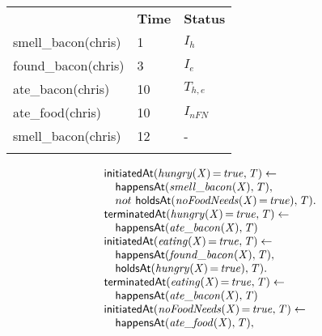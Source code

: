 \documentclass[8pt]{beamer}
\DeclareMathOperator{\val}{=}  %
\def \patsize {}
\def\happensAt{\textsf{\patsize happensAt}}
\def\holdsAt{\textsf{\patsize holdsAt}}
\def\initiatedAt{\textsf{\patsize initiatedAt}}
\def\terminatedAt{\textsf{\patsize terminatedAt}}
\newenvironment{mysplit}%
  {\arraycolsep 0pt \begin{array}{l}}%
  {\end{array}}
\begin{document}
\begin{frame}
\begin{minipage}{0.4\linewidth}
\begin{table}[t!]
\begin{center}
                \begin{tabular}{lll}
                    \hline\noalign{\smallskip}
                    \multicolumn{1}{l}{\textbf{Event}} & \multicolumn{1}{c}{\textbf{Time}} & \multicolumn{1}{c}{\textbf{Status}} \\
                    smell\_bacon(chris)& 1 & $I_{h}$\\
                    found\_bacon(chris)& 3 & $I_{e}$\\
                    ate\_bacon(chris)& 10  & $T_{h,e}$\\
                    ate\_food(chris)& 10  & $I_{nFN}$\\
                    smell\_bacon(chris)& 12 & -\\
                    \noalign{\smallskip}
                    \hline
                \end{tabular}
            \end{center}
        \end{table}
    \end{minipage}
    \begin{minipage}{0.55\linewidth}
        \begin{align*}
            \begin{mysplit}
                \initiatedAt\mathit{(hungry(X)\val true,T)\leftarrow}\\
                \quad    \happensAt\mathit{(smell\_bacon(X),T),}\\
                \quad    not\ \holdsAt\mathit{(noFoodNeeds(X)\val true),T).}\\
                \terminatedAt\mathit{(hungry(X)\val true,T)\leftarrow}\\
                \quad    \happensAt\mathit{(ate\_bacon(X),T)}\\
                \initiatedAt\mathit{(eating(X)\val true,T)\leftarrow}\\
                \quad    \happensAt\mathit{(found\_bacon(X),T),}\\
                \quad    \holdsAt\mathit{(hungry(X)\val true),T).}\\
                \terminatedAt\mathit{(eating(X)\val true,T)\leftarrow}\\
                \quad    \happensAt\mathit{(ate\_bacon(X),T)}\\
                \initiatedAt\mathit{(noFoodNeeds(X)\val true,T)\leftarrow}\\
                \quad    \happensAt\mathit{(ate\_food(X),T),}\\

\end{mysplit}
\end{align*}
\end{minipage}
\end{frame}
\end{document}

